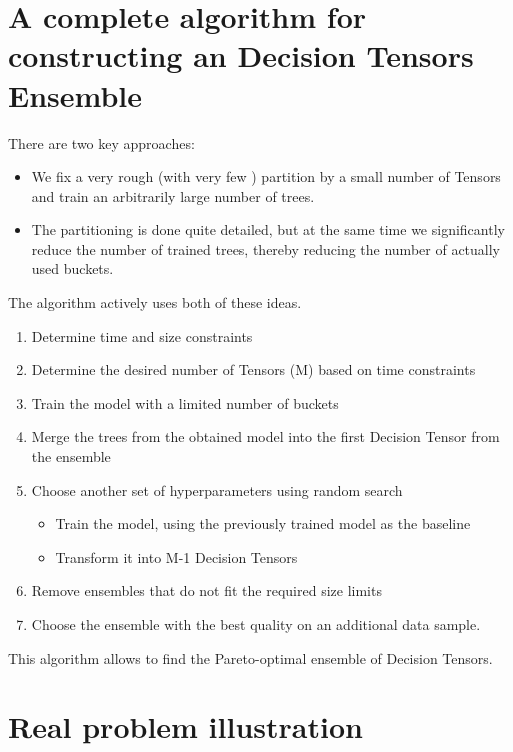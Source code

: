 \documentclass[a4paper]{jpconf}
\begin{document}
\section{A complete algorithm for constructing an Decision Tensors Ensemble}

There are two key approaches:

\medskip
\begin{itemize}
\item We fix a very rough (with very few ) partition by a small number of Tensors and train an arbitrarily large number of trees.
\item The partitioning is done quite detailed, but at the same time we significantly reduce the number of trained trees, thereby reducing the number of actually used buckets.
\end{itemize}

The algorithm actively uses both of these ideas.

\medskip
\renewcommand{\theenumi}{\arabic{enumi}}
\begin{enumerate}
\item Determine time and size constraints
\item Determine the desired number of Tensors (M) based on time constraints
\item Train the model with a limited number of buckets
\item Merge the trees from the obtained model into the first Decision Tensor from the ensemble
\item Choose another set of hyperparameters using random search
\medskip
\begin{itemize}
\item Train the model, using the previously trained model as the baseline
\item Transform it into M-1 Decision Tensors
\end{itemize}
\item Remove ensembles that do not fit the required size limits
\item Choose the ensemble with the best quality on an additional data sample.
\end{enumerate}

This algorithm allows to find the Pareto-optimal ensemble of Decision Tensors.

\section{Real problem illustration}
\end{document}
